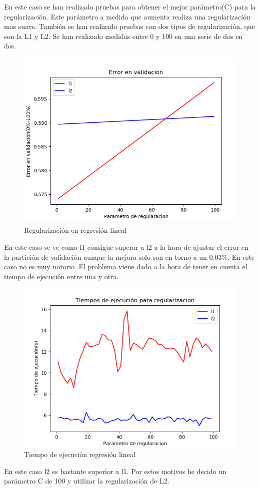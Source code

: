 \documentclass[12pt,a4paper]{article}
\begin{document}
En este caso se han realizado pruebas para obtener el mejor parámetro(C) para la regularización. Este parámetro a medida que aumenta realiza una regularización mas suave. También se han realizado pruebas con dos tipos de regularización, que son la L1 y L2. Se han realizado medidas entre 0 y 100 en una serie de dos en dos.

\begin{figure}[H]
	\centering
	\includegraphics[width=0.7\linewidth]{../imagenesRL/graficaRegularizacion}
	\caption[Regularización en regresión lineal]{Regularización en regresión lineal}
	\label{fig:Grafica de regularizacion}
\end{figure}

En este caso se ve como l1 consigue superar a l2 a la hora de ajustar el error en la partición de validación aunque la mejora solo son en torno a un 0.03\%. En este caso no es muy notorio. El problema viene dado a la hora de tener en cuenta el tiempo de ejecución entre una y otra. 
\begin{figure}[H]
	\centering
	\includegraphics[width=0.7\linewidth]{../imagenesRL/tiemposEjecucion}
	\caption[Tiempo de ejecución regresión lineal]{Tiempo de ejecución regresión lineal}
	\label{fig:tiemposejecucion}
\end{figure}
En este caso l2 es bastante superior a l1. Por estos motivos he decido un parámetro C de 100 y utilizar la regularización de L2.
\end{document}
